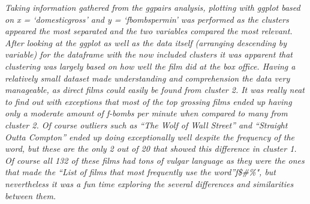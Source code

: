 \documentclass[]{article}
\begin{document}
\emph{Taking information gathered from the ggpairs analysis, plotting
with ggplot based on x = `domesticgross' and y = `fbombspermin' was
performed as the clusters appeared the most separated and the two
variables compared the most relevant. After looking at the ggplot as
well as the data itself (arranging descending by variable) for the
dataframe with the now included clusters it was apparent that clustering
was largely based on how well the film did at the box office. Having a
relatively small dataset made understanding and comprehension the data
very manageable, as direct films could easily be found from cluster 2.
It was really neat to find out with exceptions that most of the top
grossing films ended up having only a moderate amount of f-bombs per
minute when compared to many from cluster 2. Of course outliers such as
``The Wolf of Wall Street'' and ``Straight Outta Compton'' ended up
doing exceptionally well despite the frequency of the word, but these
are the only 2 out of 20 that showed this difference in cluster 1. Of
course all 132 of these films had tons of vulgar language as they were
the ones that made the ``List of films that most frequently use the
word''f\$\#\%", but nevertheless it was a fun time exploring the several
differences and similarities between them.}
\end{document}
